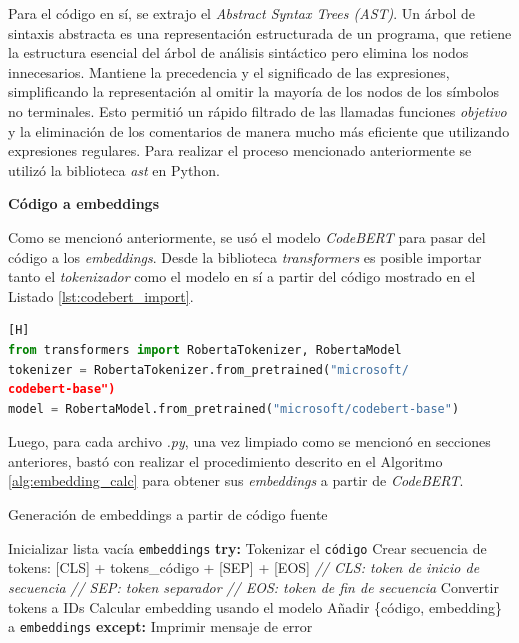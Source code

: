 \documentclass[11pt,a4paper,twoside,openany]{tesis}
\begin{document}
Para el código en sí, se extrajo el  \emph{Abstract Syntax Trees (AST)}. Un árbol de sintaxis abstracta es una representación estructurada de un programa, que retiene la estructura esencial del árbol de análisis sintáctico pero elimina los nodos innecesarios. Mantiene la precedencia y el significado de las expresiones, simplificando la representación al omitir la mayoría de los nodos de los símbolos no terminales\cite{cooper2011engineering}. Esto permitió un rápido filtrado de las llamadas funciones \emph{objetivo} y la eliminación de los comentarios de manera mucho más eficiente que utilizando expresiones regulares. Para realizar el proceso mencionado anteriormente se utilizó la biblioteca \emph{ast} \cite{ast} en Python.



\textbf{Código a embeddings}

Como se mencionó anteriormente, se usó el modelo \emph{CodeBERT} para pasar del código a los \emph{embeddings}. Desde la biblioteca \emph{transformers} \cite{roberta_model} es posible importar tanto el \emph{tokenizador} como el modelo en sí a partir del código mostrado en el Listado \ref{lst:codebert_import}.

\begin{lstlisting}[language=Python, label={lst:codebert_import}, caption={Importación de CodeBERT}][H]
from transformers import RobertaTokenizer, RobertaModel
tokenizer = RobertaTokenizer.from_pretrained("microsoft/
codebert-base")
model = RobertaModel.from_pretrained("microsoft/codebert-base")
\end{lstlisting}

Luego, para cada archivo \emph{.py}, una vez limpiado como se mencionó en secciones anteriores, bastó con realizar el procedimiento descrito en el Algoritmo \ref{alg:embedding_calc} para obtener sus \emph{embeddings} a partir de \emph{CodeBERT}.

\begin{algorithm}[H]
\caption{Generación de embeddings a partir de código fuente}
\label{alg:embedding_calc}
\begin{algorithmic}[1]
\State Inicializar lista vacía \texttt{embeddings}
    \State \textbf{try:}
	        \State Tokenizar el \texttt{código}
	        \State Crear secuencia de tokens:
	        \State \hspace{\algorithmicindent} [CLS] + tokens\_código + [SEP] + [EOS]
	        \State \hspace{\algorithmicindent} \textit{// CLS: token de inicio de secuencia}
	        \State \hspace{\algorithmicindent} \textit{// SEP: token separador}
	        \State \hspace{\algorithmicindent} \textit{// EOS: token de fin de secuencia}
	        \State Convertir tokens a IDs
	        \State Calcular embedding usando el modelo
	        \State Añadir \{código, embedding\} a \texttt{embeddings}
    \State \textbf{except:}
	        \State Imprimir mensaje de error
\EndFor
\end{algorithmic}
\end{algorithm}
\end{document}
